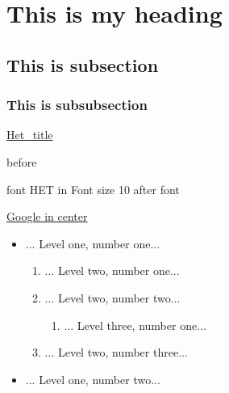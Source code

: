 \documentclass{article}
\begin{document}
\maketitle
\section{This is my heading}

\subsection{This is subsection}

\subsubsection{This is subsubsection}
\href{http://www.het.com}{Het\_title}
\par
before
\begin{comment}
 little comment: <p>&#x03C0; &#960;
\end{comment}


\newline
font
{\fontsize{11}{13}\selectfont HET in Font size 10}
after font
\newline

\newline

\centerline{\href{http://www.google.com}{Google in center}}

\begin{itemize}
\item ... Level one, number one...

\begin{enumerate}
\item ... Level two, number one...

\item ... Level two, number two...

\begin{enumerate}
\item ... Level three, number one...

\end{enumerate}

\item ... Level two, number three...

\end{enumerate}

\item ... Level one, number two...

\end{itemize}
\end{document}
